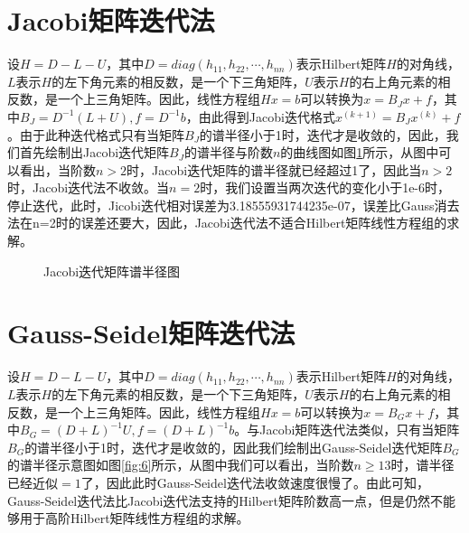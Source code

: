 \documentclass[a4paper]{article}
\begin{document}
\section{Jacobi矩阵迭代法}
设$H=D-L-U$，其中$D=diag(h_{11},h_{22},\cdots,h_{nn})$表示Hilbert矩阵$H$的对角线，$L$表示$H$的左下角元素的相反数，是一个下三角矩阵，$U$表示$H$的右上角元素的相反数，是一个上三角矩阵。因此，线性方程组$Hx=b$可以转换为$x=B_Jx+f$，其中$B_J=D^{-1}(L+U),f=D^{-1}b$，由此得到Jacobi迭代格式$x^{(k+1)}=B_Jx^{(k)}+f$。由于此种迭代格式只有当矩阵$B_J$的谱半径小于1时，迭代才是收敛的，因此，我们首先绘制出Jacobi迭代矩阵$B_J$的谱半径与阶数$n$的曲线图如图\ref{fig:5}所示，从图中可以看出，当阶数$n>2$时，Jacobi迭代矩阵的谱半径就已经超过1了，因此当$n>2$时，Jacobi迭代法不收敛。当$n=2$时，我们设置当两次迭代的变化小于1e-6时，停止迭代，此时，Jicobi迭代相对误差为3.18555931744235e-07，误差比Gauss消去法在n=2时的误差还要大，因此，Jacobi迭代法不适合Hilbert矩阵线性方程组的求解。

\begin{figure}[!h] \centering 
	\caption{Jacobi迭代矩阵谱半径图} 
	\label{fig:5} 
\end{figure}

\section{Gauss-Seidel矩阵迭代法}
设$H=D-L-U$，其中$D=diag(h_{11},h_{22},\cdots,h_{nn})$表示Hilbert矩阵$H$的对角线，$L$表示$H$的左下角元素的相反数，是一个下三角矩阵，$U$表示$H$的右上角元素的相反数，是一个上三角矩阵。因此，线性方程组$Hx=b$可以转换为$x=B_Gx+f$，其中$B_G=(D+L)^{-1}U,f=(D+L)^{-1}b$。与Jacobi矩阵迭代法类似，只有当矩阵$B_G$的谱半径小于1时，迭代才是收敛的，因此我们绘制出Gauss-Seidel迭代矩阵$B_G$的谱半径示意图如图\ref{fig:6}所示，从图中我们可以看出，当阶数$n\ge 13$时，谱半径已经近似$=1$了，因此此时Gauss-Seidel迭代法收敛速度很慢了。由此可知，Gauss-Seidel迭代法比Jacobi迭代法支持的Hilbert矩阵阶数高一点，但是仍然不能够用于高阶Hilbert矩阵线性方程组的求解。
\end{document}
